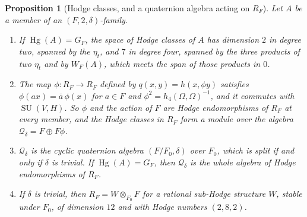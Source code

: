 \documentclass[11pt,reqno]{amsart}
\theoremstyle{plain}
\newtheorem{proposition}[theorem]{Proposition}
\theoremstyle{definition}
\theoremstyle{remark}
\newcommand{\cQ}{\mathcal{Q}}
\DeclareMathOperator{\Hg}{Hg}
\DeclareMathOperator{\SU}{SU}
\newcommand{\bbar}[1]{\overline{#1}}
\begin{document}
\begin{proposition}[Hodge classes, and a quaternion algebra acting on $R_{F}$]
\label{prop:quarticquat}
Let $A$ be a member of an $(F,2,\delta)$-family.
\begin{enumerate}[label=\textup{(\roman*)},leftmargin=2.6em,itemsep=2pt]
\item If $\Hg(A)=G_{F}$, the space of Hodge classes of $A$ has dimension $2$
  in degree two, spanned by the $\eta_{t}$, and $7$ in degree four, spanned by
  the three products of two $\eta_{t}$ and by $W_{F}(A)$, which meets the span
  of those products in $0$.
\item The map $\phi\colon R_{F}\to R_{F}$ defined by $q(x,y)=h(x,\phi y)$
  satisfies $\phi(ax)=\bbar a\,\phi(x)$ for $a\in F$ and
  $\phi^{2}=h_{4}(\Omega,\Omega)^{-1}$, and it commutes with $\SU(V,H)$. So
  $\phi$ and the action of $F$ are Hodge endomorphisms of $R_{F}$ at every
  member, and the Hodge classes in $R_{F}$ form a module over the algebra
  $\cQ_{\delta}=F\oplus F\phi$.
\item $\cQ_{\delta}$ is the cyclic quaternion algebra $(F/F_{0},\delta)$ over
  $F_{0}$, which is split if and only if $\delta$ is trivial. If
  $\Hg(A)=G_{F}$, then $\cQ_{\delta}$ is the whole algebra of Hodge
  endomorphisms of $R_{F}$.
\item If $\delta$ is trivial, then $R_{F}=W\otimes_{F_{0}}F$ for a rational
  sub-Hodge structure $W$, stable under $F_{0}$, of dimension $12$ and with
  Hodge numbers $(2,8,2)$.
\end{enumerate}
\end{proposition}
\end{document}
